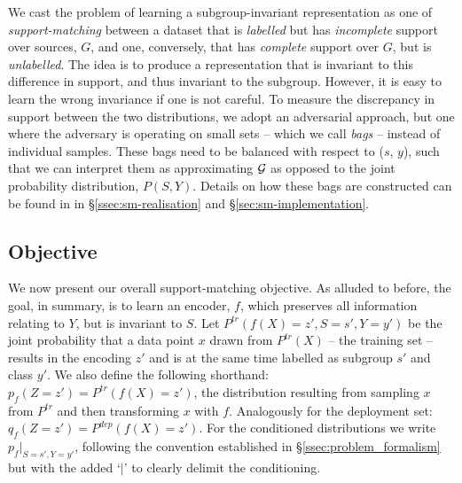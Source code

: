 

We cast the problem of learning a subgroup-invariant representation as one of
\emph{support-matching} between a dataset that is \emph{labelled} but has \emph{incomplete} support
over sources, $G$, and one, conversely, that has \emph{complete} support over $G$, but is
\emph{unlabelled}. 
%
The idea is to produce a representation that is invariant to this difference in support, and thus
invariant to the subgroup. However, it is easy to learn the wrong invariance if one is not careful.
To measure the discrepancy in support between the two distributions, we adopt an adversarial
approach, but one where the adversary is operating on small sets -- which we call \emph{bags} --
instead of individual samples. 
%
%
%
These bags need to be balanced with respect to ($s$, $y$), such that we can interpret them as
approximating ${\mathcal{G}}$ as opposed to the joint probability distribution, $P(S, Y)$.
%
Details on how these bags are constructed can be found in in \S\ref{ssec:sm-realisation} and
\S\ref{sec:sm-implementation}.


\subsection{Objective}\label{ssec:sm-objective}
%
We now present our overall support-matching objective. 
%
As alluded to before, the goal, in summary, is to learn an encoder, \(f\), which
preserves all information relating to $Y$, but is invariant to $S$. 
Let \(P^{tr}(f(X)=z', S=s',Y=y')\) be the joint probability that a data point \(x\) drawn
from \(P^{tr}(X)\) -- the training set -- results in the encoding \(z'\) and is at the same
time labelled as subgroup \(s'\) and class \(y'\). 
%
We also define the following shorthand: $p_f(Z=z')=P^{tr}(f(X)=z')$, the distribution
resulting from sampling \(x\) from \(P^{tr}\) and then transforming \(x\) with \(f\).
%
Analogously for the deployment set: $q_f(Z=z')=P^{dep}(f(X)=z')$. 
%
For the conditioned distributions we write $p_f|_{S=s',Y=y'}$, following the convention established
in \S\ref{ssec:problem_formalism} but with the added `\(|\)' to clearly delimit the
conditioning.

